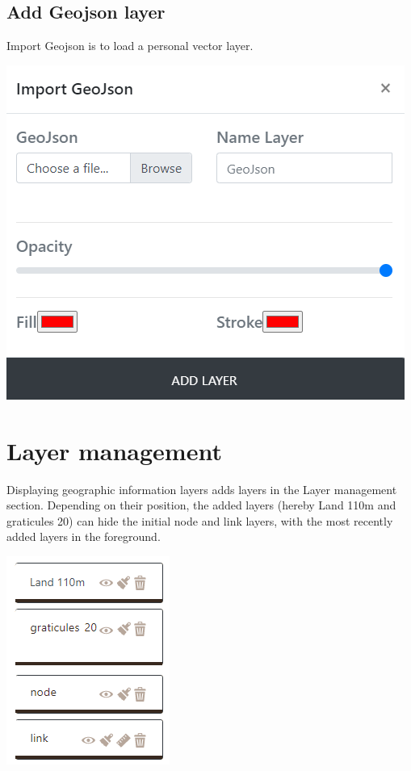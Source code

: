 \documentclass[
  letterpaper,
  DIV=11,
  numbers=noendperiod]{scrreprt}
\begin{document}
\subsection{Add Geojson layer}\label{add-geojson-layer}

Import Geojson is to load a personal vector layer.

\begin{center}
\includegraphics{images/Geo_Add_geojson.png}
\end{center}

\section{Layer management}\label{layer-management}

Displaying geographic information layers adds layers in the Layer
management section. Depending on their position, the added layers
(hereby Land 110m and graticules 20) can hide the initial node and link
layers, with the most recently added layers in the foreground.

\includegraphics{images/Dispositions_all.png}
\end{document}
